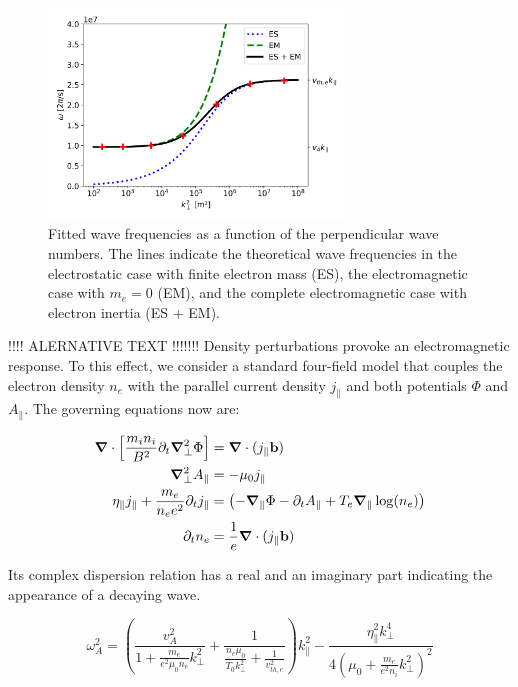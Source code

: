 \begin{figure}[h]\centering
	\centering
	\includegraphics[width=0.7\textwidth]{schemes/transitionAlfvenThermal.png}
	\caption{Fitted wave frequencies as a function of the perpendicular wave numbers. The lines indicate the theoretical wave frequencies in the electrostatic case with finite electron mass (ES), the electromagnetic case with $m_e = 0$ (EM), and the complete electromagnetic case with electron inertia (ES + EM).}
	\label{fig:transitionSLAB}
\end{figure}




!!!! ALERNATIVE TEXT !!!!!!!
Density perturbations provoke an electromagnetic response. To this effect, we consider a standard four-field model that couples the electron density $n_e$ with the parallel current density $j_\parallel$ and both potentials $\Phi$ and $A_\parallel$. The governing equations now are: 

\begin{align}
	\grad\cdot\left[\frac{m_i n_i}{ B^2}\partial_t\grad^2_\perp\Phi\right] &= \grad\cdot(j_\parallel\mathbf{b}) \\
	\grad^2_\perp A_\parallel &= -\mu_0j_\parallel \\
	\eta_\parallel j_\parallel + \frac{ m_e}{n_ee^2} \partial_t j_\parallel  &= \left(-\grad_\parallel\Phi - \partial_t A_\parallel + T_e\grad_\parallel\log(n_e)\right) \\
	\partial_t n_e &= \frac{1}{e}\grad\cdot (j_\parallel\mathbf{b}) 
	\label{eq:fourFieldModel}
\end{align}

Its complex dispersion relation has a real and an imaginary part indicating the appearance of a decaying wave. 

\begin{equation}
	\label{eq:dispersionRelation}
	\omega_A^2 = \left(\frac{v_A^2}{1 + \frac{m_e}{e^2 \mu_0 n_e} k_\perp^2} + \frac{1}{\frac{n_e \mu_0}{T_0 k_\perp^2} + \frac{1}{v_{th,e}^2}}\right) k_\parallel^2 - \frac{\eta_\parallel^2k_\perp^4}{4\left(\mu_0+\frac{m_e}{e^2n_i}k_\perp^2\right)^2}
\end{equation}

